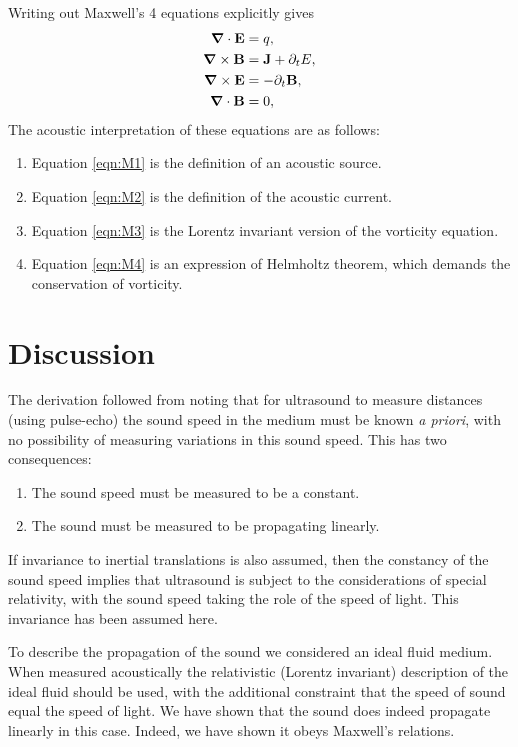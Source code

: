 \documentclass[10pt, fleqn,final,showtrims,oldfontcommands, article,a4paper,oneside]{memoir} %
\newcommand{\sub}[1]{\begin{subequations}#1\end{subequations}}
\newcommand{\eqa}[1]{\begin{align}#1\end{align}}
\newcommand{\eqnref}[1]{\ref{eqn:#1}}
\renewcommand{\d}{\partial}
\newcommand{\del}{\nabla}
\newcommand{\vdel}{ \mbox{\boldmath $\del$}}
\newcommand{\dt}{{\d_t}}
\newcommand{\vJ}{\vect J}
\newcommand{\vE}{\vect E}
\newcommand{\vB}{\vect B}
\newcommand{\vect}[1]{\mathbf{#1}}
\newcommand{\nlist}[1]
	   {  
	     \begin{enumerate}
	       #1
	     \end{enumerate} 
	   }
\begin{document}
Writing out Maxwell's 4 equations explicitly gives
\sub{
\eqa{
 \vdel \cdot \vE &= q,\label{eqn:M1}  \\ 
 \vdel \times \vB &= \vJ + \dt E, \label{eqn:M2}\\
 \vdel \times \vE &= -\dt\vB\label{eqn:M3},\\
 \vdel \cdot \vB &= 0\label{eqn:M4},
}
}
The acoustic interpretation of these equations are as follows:
\nlist{
\item Equation \eqnref{M1} is the definition of an acoustic source.
\item Equation \eqnref{M2} is the definition of the acoustic current.
\item Equation \eqnref{M3} is the Lorentz invariant version of the vorticity equation.
\item Equation \eqnref{M4} is an expression of Helmholtz theorem, which demands the conservation of vorticity.
}



\section{Discussion}\label{sec:discussion}



The derivation followed from noting that for ultrasound to measure distances (using pulse-echo) 
the sound speed in the medium must be known {\em a priori}, 
with no possibility of measuring variations in this sound speed.
This has two consequences:
\begin{enumerate}
  \item The sound speed must be measured to be a constant.
  \item The sound must be measured to be propagating linearly.
\end{enumerate}
If invariance to inertial translations is also assumed,
then the constancy of the sound speed  implies that 
ultrasound is subject to the considerations of special relativity,
with the sound speed taking the role of the speed of light.
This invariance has been assumed here.

To describe the propagation of the sound we considered an ideal fluid medium.
When measured acoustically the relativistic (Lorentz invariant) description of the ideal fluid should be used,
with the additional constraint that the speed of sound equal the speed of light.
We have shown that the sound does indeed propagate linearly in this case.
Indeed, we have shown it obeys Maxwell's relations.
\end{document}
